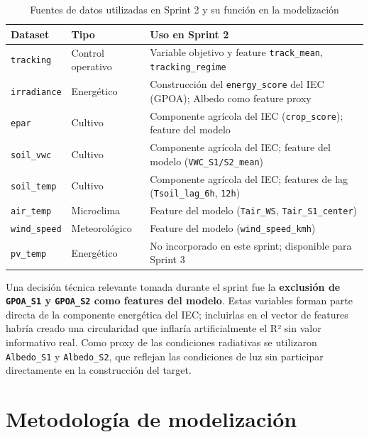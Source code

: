 \documentclass[12pt,a4paper]{article}
\begin{document}
\begin{table}[H]
\centering
\caption{Fuentes de datos utilizadas en Sprint 2 y su función en la modelización}
\label{tab:datos_s2}
\renewcommand{\arraystretch}{1.3}
\begin{tabularx}{\textwidth}{llX}
\toprule
\textbf{Dataset} & \textbf{Tipo} & \textbf{Uso en Sprint 2} \\
\midrule
\texttt{tracking}    & Control operativo  & Variable objetivo y feature \texttt{track\_mean}, \texttt{tracking\_regime} \\
\texttt{irradiance}  & Energético         & Construcción del \texttt{energy\_score} del IEC (GPOA); Albedo como feature proxy \\
\texttt{epar}        & Cultivo            & Componente agrícola del IEC (\texttt{crop\_score}); feature del modelo \\
\texttt{soil\_vwc}   & Cultivo            & Componente agrícola del IEC; feature del modelo (\texttt{VWC\_S1/S2\_mean}) \\
\texttt{soil\_temp}  & Cultivo            & Componente agrícola del IEC; features de lag (\texttt{Tsoil\_lag\_6h}, \texttt{12h}) \\
\texttt{air\_temp}   & Microclima         & Feature del modelo (\texttt{Tair\_WS}, \texttt{Tair\_S1\_center}) \\
\texttt{wind\_speed} & Meteorológico      & Feature del modelo (\texttt{wind\_speed\_kmh}) \\
\texttt{pv\_temp}    & Energético         & No incorporado en este sprint; disponible para Sprint 3 \\
\bottomrule
\end{tabularx}
\end{table}

Una decisión técnica relevante tomada durante el sprint fue la \textbf{exclusión de \texttt{GPOA\_S1} y \texttt{GPOA\_S2} como features del modelo}. Estas variables forman parte directa de la componente energética del IEC; incluirlas en el vector de features habría creado una circularidad que inflaría artificialmente el R² sin valor informativo real. Como proxy de las condiciones radiativas se utilizaron \texttt{Albedo\_S1} y \texttt{Albedo\_S2}, que reflejan las condiciones de luz sin participar directamente en la construcción del target.

\section{Metodología de modelización}
\end{document}
